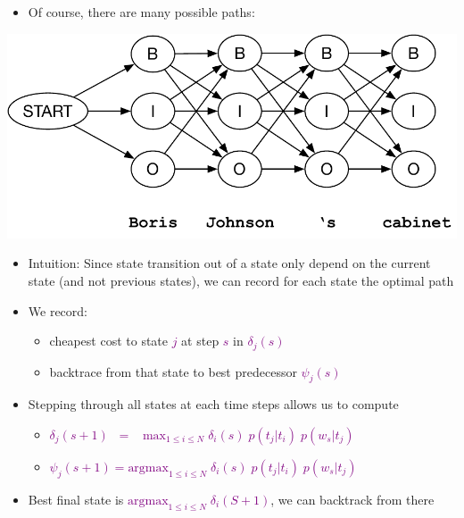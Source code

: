 \documentclass[landscape]{jhuslides3C}
\newcommand{\maths}[1]{\textcolor{purple}{#1}}
\begin{document}
\vfill
\begin{itemize}
\item Of course, there are many possible paths:
\end{itemize}
\vfill
\begin{center}
\includegraphics[scale=1.2]{hmm-search-ne3.pdf}
\end{center}
\vfill


\vfill
\begin{itemize}
\item Intuition: Since state transition out of a state only depend on the current state (and not previous states), we can record for each state the optimal path\pause
\item We record:
\begin{itemize}
\item cheapest cost to state \maths{$j$} at step \maths{$s$} in \maths{$\delta_j(s)$}
\item backtrace from that state to best predecessor \maths{$\psi_j(s)$}\pause
\end{itemize}
\item Stepping through all states at each time steps allows us to compute
\begin{itemize}
\item \maths{$\delta_j(s+1) \; \; = \; \; \; \mbox{max}_{1 \le i \le N} \; \delta_i(s) \; p(t_j|t_i)\; p(w_s|t_j)$}
\item \maths{$\psi_j(s+1) = \mbox{argmax}_{1 \le i \le N} \; \delta_i(s) \; p(t_j|t_i)\; p(w_s|t_j)$}\pause
\end{itemize}
\item Best final state is \maths{$\mbox{argmax}_{1 \le i \le N} \; \delta_i(S+1)$}, we can backtrack from there
\end{itemize}
\vfill
\end{document}
